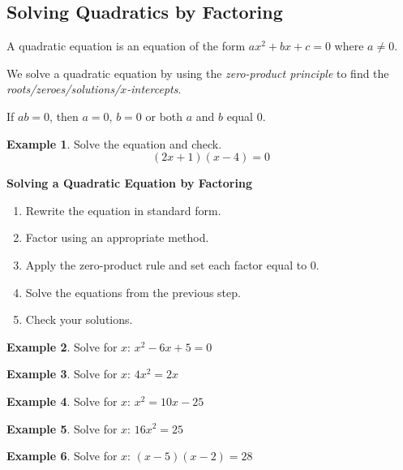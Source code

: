 \documentclass[addpoints,12pt]{exam}
\theoremstyle{definition}
\theoremstyle{break}
\theoremstyle{break}
\newtheorem{example}{Example}[subsection]
\begin{document}
\setcounter{section}{6}
\setcounter{subsection}{5}

\subsection{Solving Quadratics by Factoring}

\vspace{.15in}

\begin{definition}
A quadratic equation is an equation of the form $ax^2 + bx + c = 0$ where $a \neq 0$.
\end{definition}
\vspace{.15in}

\noindent We solve a quadratic equation by using the \emph{zero-product principle} to find the \emph{roots/zeroes/solutions/$x$-intercepts}.
\vspace{.15in}

\begin{definition}
If $ab = 0$, then $a = 0$, $b=0$ or both $a$ and $b$ equal 0.
\end{definition}
\vspace{.15in}

\begin{example}
Solve the equation and check.
\[(2x+1)(x-4) = 0\]
\vspace{2in}
\end{example}

\begin{mdframed}
\textbf{Solving a Quadratic Equation by Factoring}
\begin{enumerate}
\item Rewrite the equation in standard form.
\item Factor using an appropriate method.
\item Apply the zero-product rule and set each factor equal to 0.
\item Solve the equations from the previous step.
\item Check your solutions.
\end{enumerate}
\end{mdframed}
\vspace{.15in}

\begin{example}
Solve for $x$: $x^2 - 6x + 5 = 0$
\vspace{2.25in}
\end{example}

\begin{example}
Solve for $x$: $4x^2 = 2x$
\vspace{2.25in}
\end{example}

\begin{example}
Solve for $x$: $x^2 = 10x - 25$
\end{example}
\newpage

\begin{example}
Solve for $x$: $16x^2 = 25$
\vspace{2.25in}
\end{example}

\begin{example}
Solve for $x$: $(x-5)(x-2) = 28$
\end{example}
\end{document}
